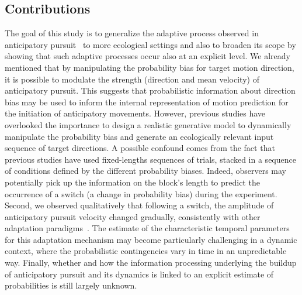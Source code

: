 \documentclass[10pt,letterpaper]{article}
\newcommand{\citep}[1]{\cite{#1}}
\newcommand{\citet}[1]{\cite{#1}}
\begin{document}
\subsection*{Contributions}%
The goal of this study is to generalize the adaptive process
observed in anticipatory pursuit~\citep{Montagnini2010,SantosKowler2017}
to more ecological settings and
also to broaden its scope by showing that such adaptive processes
occur also at an explicit level.
We already mentioned that by manipulating the probability bias for target motion direction,
it is possible to modulate the strength (direction and mean velocity) of anticipatory pursuit.
This suggests that probabilistic information about direction bias may be used
to inform the internal representation of motion prediction
for the initiation of anticipatory movements.
However, %
previous studies have overlooked the importance to design a realistic generative model to dynamically manipulate the probability bias
and generate an ecologically relevant input sequence of target directions.
A possible confound comes from the fact that
previous studies have used fixed-lengths sequences of trials, %
stacked in a sequence of conditions defined by the different probability biases.
Indeed, observers may potentially pick up
the information on the block's length
to predict the occurrence of a switch (a change in probability bias) during the experiment.
Second, we observed qualitatively that following a switch,
the amplitude of anticipatory pursuit velocity changed gradually,
consistently with other adaptation paradigms~\citep{Fukushima1996,Kahlon1996,Souto13}.
The estimate of the characteristic temporal parameters for this adaptation mechanism
may become particularly challenging in a dynamic context,
where the probabilistic contingencies vary in time in an unpredictable way.
Finally, whether and how the information processing underlying
the buildup of anticipatory pursuit and its dynamics is linked to
an explicit estimate of probabilities is still largely unknown.
\end{document}
